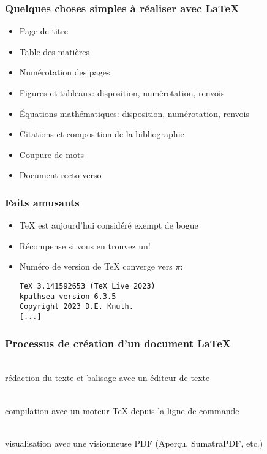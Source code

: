 \begin{frame}
  \frametitle{Quelques choses simples à réaliser avec {\LaTeX}}

  \begin{itemize}
  \item Page de titre
  \item Table des matières
  \item Numérotation des pages
  \item Figures et tableaux: disposition, numérotation, renvois
  \item Équations mathématiques: disposition, numérotation, renvois
  \item Citations et composition de la bibliographie
  \item Coupure de mots
  \item Document recto verso
  \end{itemize}
\end{frame}

\begin{frame}[fragile=singleslide]
  \frametitle{Faits amusants}
  \begin{itemize}
  \item {\TeX} est aujourd'hui considéré exempt de bogue
  \item Récompense si vous en trouvez un!
  \item Numéro de version de {\TeX} converge vers $\pi$:
\begin{lstlisting}
TeX 3.141592653 (TeX Live 2023)
kpathsea version 6.3.5
Copyright 2023 D.E. Knuth.
[...]
\end{lstlisting} %
  \end{itemize}
\end{frame}

\begin{frame}
  \frametitle{Processus de création d'un document {\LaTeX}}
  \Huge
  \begin{minipage}[t]{0.25\textwidth}
    \centering
    \faFile*[regular] \\ \bigskip
    \small
    rédaction du texte et balisage avec un \alert{éditeur de texte}
  \end{minipage}
  \hfill\faArrowRight\hfill
  \begin{minipage}[t]{0.25\textwidth}
    \centering
    \faCogs \\  \bigskip
    \small
    compilation avec un \alert{moteur} {\TeX} depuis la ligne de commande
  \end{minipage}
  \hfill\faArrowRight\hfill
  \begin{minipage}[t]{0.3\textwidth}
    \centering
    \faFilePdf[regular] \\  \bigskip
    \small
    visualisation avec une visionneuse PDF (Aperçu,
    SumatraPDF, etc.)
  \end{minipage}
\end{frame}

